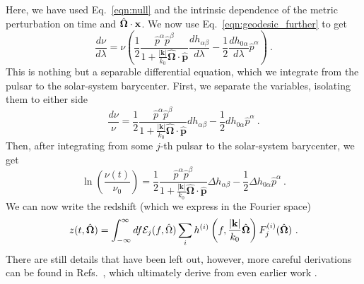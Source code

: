 \documentclass[prd,twocolumn,aps,psfig,nofootinbib,nobibnotes,superscriptaddress,preprintnumbers,times]{revtex4-2}
\begin{document}
Here, we have used Eq.\ \ref{eqn:null} and the intrinsic dependence of the metric perturbation on time and $\hat{\bf \Omega}\cdot {\bf x}$. We now use Eq.\ \ref{eqn:geodesic_further} to get 
\begin{equation}\label{eqn:dnudl}
    \frac{d\nu}{d\lambda} = \nu \left( \frac{1}{2} \frac{\hat{p}^\alpha \hat{p}^\beta}{1+\frac{|\boldsymbol{k}|}{k_0} \hat{\boldsymbol{\Omega}} \cdot \hat{\boldsymbol{p}}}\frac{d h_{\alpha \beta}}{d \lambda} - \frac{1}{2} \frac{dh_{0\alpha}}{d\lambda}\hat{p}^\alpha \right) \ .
\end{equation}
This is nothing but a separable differential equation, which we integrate from the pulsar to the solar-system barycenter. First, we separate the variables, isolating them to either side
\begin{equation}\label{eqn:diff_eq}
    \frac{d\nu}{\nu} =  \frac{1}{2} \frac{\hat{p}^\alpha \hat{p}^\beta}{1+\frac{|\boldsymbol{k}|}{k_0} \hat{\boldsymbol{\Omega}} \cdot \hat{\boldsymbol{p}}}d h_{\alpha \beta} - \frac{1}{2} dh_{0\alpha}\hat{p}^\alpha \ .
\end{equation}
Then, after integrating from some $j$-th pulsar to the solar-system barycenter, we get 
\begin{equation}\label{eqn:integrating_eq}
    \ln\left(\frac{\nu(t)}{\nu_0}\right) =  \frac{1}{2} \frac{\hat{p}^\alpha \hat{p}^\beta}{1+\frac{|\boldsymbol{k}|}{k_0} \hat{\boldsymbol{\Omega}} \cdot \hat{\boldsymbol{p}}}\Delta h_{\alpha \beta} - \frac{1}{2} \Delta h_{0\alpha}\hat{p}^\alpha \ .
\end{equation}
We can now write the redshift (which we express in the Fourier space)
\begin{equation}\label{eqn:redshift}
    z(t, \hat{\bf \Omega}) = \int_{-\infty}^\infty df \mathcal{E}_j(f, \hat{\Omega}) \sum_i h^{(i)}\left(f, \frac{|{\bf k}|}{k_0} \hat{\bf \Omega}\right)F^{(i)}_j(\hat{\bf \Omega}) \ .
\end{equation}
There are still details that have been left out, however, more careful derivations can be found in Refs.\ \cite{Anholm:2008wy, Liang:2021bct}, which ultimately derive from even earlier work \cite{Detweiler:1979wn, Estabrook:1975jtn, Kaufmann:1970}.
\end{document}
